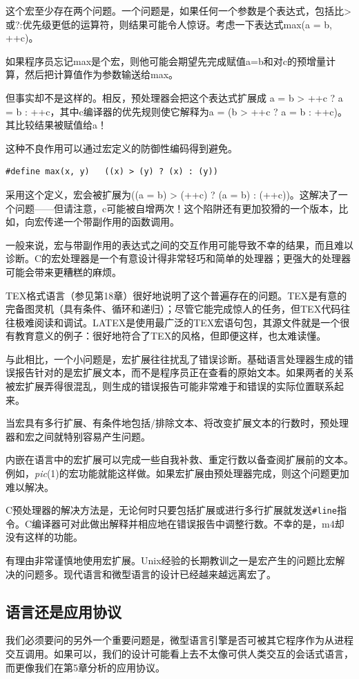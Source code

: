 \documentclass[12pt,oneside]{book}
\begin{document}
这个宏至少存在两个问题。一个问题是，如果任何一个参数是个表达式，包括比>或?:优先级更低的运算符，则结果可能令人惊讶。考虑一下表达式max(a = b, ++c)。

如果程序员忘记max是个宏，则他可能会期望先完成赋值a=b和对c的预增量计算，然后把计算值作为参数输送给max。

但事实却不是这样的。相反，预处理器会把这个表达式扩展成 a = b > ++c ? a = b : ++c，其中c编译器的优先规则使它解释为a = (b > ++c ? a = b : ++c)。其比较结果被赋值给a！

这种不良作用可以通过宏定义的防御性编码得到避免。
\begin{Verbatim}
#define max(x, y)	((x) > (y) ? (x) : (y))
\end{Verbatim}

采用这个定义，宏会被扩展为((a = b) > (++c) ? (a = b) : (++c))。这解决了一个问题——但请注意，c可能被自增两次！这个陷阱还有更加狡猾的一个版本，比如，向宏传递一个带副作用的函数调用。

一般来说，宏与带副作用的表达式之间的交互作用可能导致不幸的结果，而且难以诊断。C的宏处理器是一个有意设计得非常轻巧和简单的处理器；更强大的处理器可能会带来更糟糕的麻烦。

TEX格式语言（参见第18章）很好地说明了这个普遍存在的问题。TEX是有意的完备图灵机（具有条件、循环和递归）；尽管它能完成惊人的任务，但TEX代码往往极难阅读和调试。LATEX是使用最广泛的TEX宏语句包，其源文件就是一个很有教育意义的例子：很好地符合了TEX的风格，但即便这样，也太难读懂。

与此相比，一个小问题是，宏扩展往往扰乱了错误诊断。基础语言处理器生成的错误报告针对的是宏扩展文本，而不是程序员正在查看的原始文本。如果两者的关系被宏扩展弄得很混乱，则生成的错误报告可能非常难于和错误的实际位置联系起来。

当宏具有多行扩展、有条件地包括/排除文本、将改变扩展文本的行数时，预处理器和宏之间就特别容易产生问题。

内嵌在语言中的宏扩展可以完成一些自我补救、重定行数以备查阅扩展前的文本。例如，\textit{pic}(1)的宏功能就能这样做。如果宏扩展由预处理器完成，则这个问题更加难以解决。

C预处理器的解决方法是，无论何时只要包括扩展或进行多行扩展就发送\verb+#line+指令。C编译器可对此做出解释并相应地在错误报告中调整行数。不幸的是，m4却没有这样的功能。

有理由非常谨慎地使用宏扩展。Unix经验的长期教训之一是宏产生的问题比宏解决的问题多。现代语言和微型语言的设计已经越来越远离宏了。

\subsection{语言还是应用协议}
我们必须要问的另外一个重要问题是，微型语言引擎是否可被其它程序作为从进程交互调用。如果可以，我们的设计可能看上去不太像可供人类交互的会话式语言，而更像我们在第5章分析的应用协议。
\end{document}
